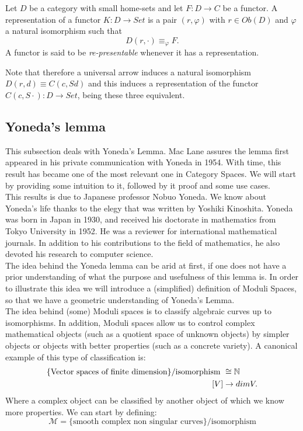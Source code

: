 \begin{definition}
  Let $D$ be a category with small home-sets and let $F:D\to C$ be a functor. A representation of a functor $K:D\to Set$ is a pair $(r,\varphi)$ with $r \in Ob(D)$ and $ \varphi$ a natural isomorphism  such that
  $$D(r,\cdot) \equiv_{\varphi} F.$$
  A functor is said to be \emph{re-presentable} whenever it has a representation.
\end{definition}

Note that therefore a universal arrow induces a natural isomorphism $D(r,d)\equiv C(c,Sd)$ and this induces a representation of the functor $C(c,S\cdot): D\to Set$, being these three equivalent.

\subsection{Yoneda's lemma}
This subsection  deals with Yoneda's Lemma. Mac Lane\cite{mac2013categories} assures the lemma first appeared in his private communication with Yoneda in 1954. With time, this result has became one of the most relevant one in Category Spaces. We will start by providing some intuition to it, followed by it proof and some use cases.\\


 This results is due to Japanese professor Nobuo Yoneda. We know about Yoneda's life thanks to the elegy that was written by Yoshiki Kinoshita\cite{YonedaLife}. Yoneda was born in Japan in 1930, and received his doctorate in mathematics from Tokyo University in 1952. He was a reviewer for international mathematical journals. In addition to his contributions to the field of mathematics, he also devoted his research to computer science.\\


The idea behind the Yoneda lemma can be arid at first, if one does not have a prior understanding of what the purpose and usefulness of this lemma is. In order to illustrate this idea we will introduce a (simplified) definition of Moduli Spaces, so that we have a geometric understanding of Yoneda's Lemma.\\

The idea behind (some) Moduli spaces is to classify algebraic curves up to isomorphisms. In addition, Moduli spaces allow us to control complex mathematical objects (such as a quotient space of unknown objects) by simpler objects or objects with better properties (such as a concrete variety). A canonical example of this type of classification is:  
\begin{align*}
  \{\text{Vector spaces of finite dimension}\}/\text{isomorphism } &\cong \mathbb{N}\\
  [V] &\to dim V.
\end{align*}
Where a complex object can be classified by another object of which we know more properties. We can start by defining:  
$$\mathcal{M} = \{\text{smooth complex non singular curves} \}/\text{isomorphism}$$

